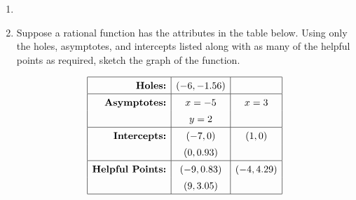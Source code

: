 \documentclass[11pt]{article}
\begin{document}
\begin{enumerate}
{%

}

\newpage

% 

\item %
\providecommand{\stxKnowl}{}\renewcommand{\stxKnowl}[1]{#1}
\providecommand{\stxOuttro}{}\renewcommand{\stxOuttro}[1]{#1}
\providecommand{\stxTitle}{}\renewcommand{\stxTitle}[1]{#1}
\renewcommand{\stxOuttro}[1]{}
\stxKnowl{



\stxOuttro{
\(\displaystyle \lim_{x \to 1} \frac{x^{2} - 4 \, x + 3}{x^{2} - 1} = \displaystyle \lim_{x \to 1} \frac{(x - 1)(x - 3)}{(x - 1)(x + 1)} = \displaystyle \lim_{x \to 1} \frac{x - 3}{x + 1} = -1\)

\(\displaystyle \lim_{x \to 6} \frac{x^{2} - 3 \, x - 4}{x + 1} = \frac{14}{7} = 2\)

\(\displaystyle \lim_{x \to 7} \sqrt{x^{2} + 4 \, x + 4} = \sqrt{81} = 9\)

}
}

\newpage

% 

\item %
\providecommand{\stxKnowl}{}\renewcommand{\stxKnowl}[1]{#1}
\providecommand{\stxOuttro}{}\renewcommand{\stxOuttro}[1]{#1}
\providecommand{\stxTitle}{}\renewcommand{\stxTitle}[1]{#1}
\renewcommand{\stxOuttro}[1]{}
\stxKnowl{
Suppose a rational function has the attributes in the table below. Using only the holes, asymptotes, and intercepts listed along with as many of the helpful points as required, sketch the graph of the function.

 \[\renewcommand{\arraystretch}{1.4} \begin{array}{|r|c|c|} \hline \textbf{Holes:} & (-6, -1.56) & \\ \hline \textbf{Asymptotes:} & x = -5 & x = 3 \\ & y = 2 & \\ \hline \textbf{Intercepts:} & (-7, 0) & (1, 0) \\ & (0, 0.93) & \\ \hline \textbf{Helpful Points:} & (-9, 0.83) & (-4, 4.29) \\ & (9, 3.05) & \\ \hline \end{array}\] 

}
\end{enumerate}
\end{document}
